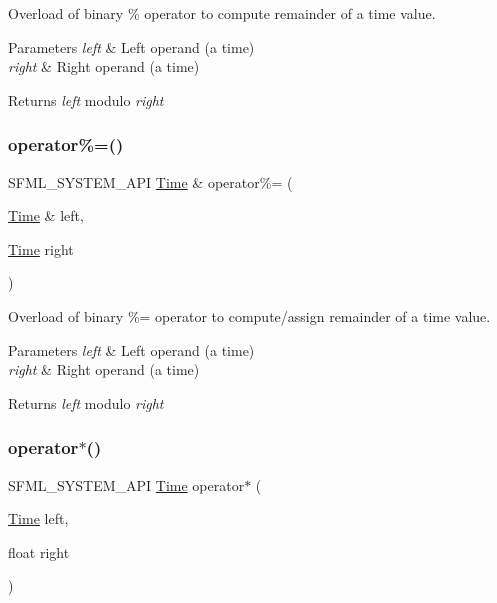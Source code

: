Overload of binary \% operator to compute remainder of a time value. 


\begin{DoxyParams}{Parameters}
{\em left} & Left operand (a time) \\
\hline
{\em right} & Right operand (a time)\\
\hline
\end{DoxyParams}
\begin{DoxyReturn}{Returns}
{\itshape left} modulo {\itshape right} 
\end{DoxyReturn}
\mbox{\label{classsf_1_1_time_af12dd271f14a17b58c9d737395e776d4}} 
\subsubsection{\texorpdfstring{operator\%=()}{operator\%=()}}
{\footnotesize\ttfamily S\+F\+M\+L\+\_\+\+S\+Y\+S\+T\+E\+M\+\_\+\+A\+PI \hyperlink{classsf_1_1_time}{Time} \& operator\%= (\begin{DoxyParamCaption}\item[{\hyperlink{classsf_1_1_time}{Time} \&}]{left,  }\item[{\hyperlink{classsf_1_1_time}{Time}}]{right }\end{DoxyParamCaption})\hspace{0.3cm}{\ttfamily [related]}}



Overload of binary \%= operator to compute/assign remainder of a time value. 


\begin{DoxyParams}{Parameters}
{\em left} & Left operand (a time) \\
\hline
{\em right} & Right operand (a time)\\
\hline
\end{DoxyParams}
\begin{DoxyReturn}{Returns}
{\itshape left} modulo {\itshape right} 
\end{DoxyReturn}
\mbox{\label{classsf_1_1_time_ac1386c6360872d354b9b59eadcd9778d}} 
\subsubsection{\texorpdfstring{operator$\ast$()}{operator*()}\hspace{0.1cm}{\footnotesize\ttfamily [1/4]}}
{\footnotesize\ttfamily S\+F\+M\+L\+\_\+\+S\+Y\+S\+T\+E\+M\+\_\+\+A\+PI \hyperlink{classsf_1_1_time}{Time} operator$\ast$ (\begin{DoxyParamCaption}\item[{\hyperlink{classsf_1_1_time}{Time}}]{left,  }\item[{float}]{right }\end{DoxyParamCaption})\hspace{0.3cm}{\ttfamily [related]}}



